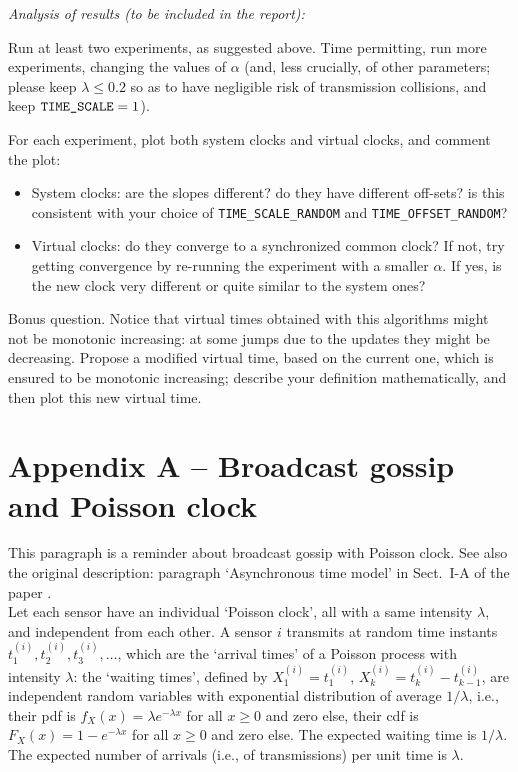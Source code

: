 \documentclass{article}
\begin{document}
{\itshape \color{blue} Analysis of results (to be included in the report):

Run at least two experiments, as suggested above.
Time permitting, run more experiments, changing the values of $\alpha$
(and, less crucially, of other parameters; please keep  $\lambda \le 0.2$ so as to have negligible risk of transmission collisions, and keep
$\verb=TIME_SCALE= = 1$).

For each experiment, plot both system clocks and virtual clocks, and comment the plot:
\begin{itemize}
	\item System clocks: are the slopes different? do they have different off-sets? is this consistent with your choice of \verb=TIME_SCALE_RANDOM= and \verb=TIME_OFFSET_RANDOM=?
	\item Virtual clocks: do they converge to a synchronized common clock? If not, try getting convergence by re-running the experiment with a smaller $\alpha$. If yes, is the new clock very different or quite similar to the system ones?
\end{itemize}
Bonus question. Notice that virtual times obtained with this algorithms might not be monotonic increasing: at some jumps due to the updates they might be decreasing. Propose a modified virtual time, based on the current one, which is ensured to be monotonic increasing; describe your definition mathematically, and then plot this new virtual time.
} %


\section*{Appendix A -- Broadcast gossip and Poisson clock}
This paragraph is a reminder about broadcast gossip with Poisson clock. See also the original description: paragraph `Asynchronous time model' in Sect.~I-A of the paper \cite{gossip-poisson}.\\

Let each sensor have an individual `Poisson clock', all with a same intensity $\lambda$, and independent from each other. A sensor $i$ transmits at random time instants $t_1^{(i)}, t_2^{(i)}, t_3^{(i)}, \dots$, which are the `arrival times' of a Poisson process with intensity $\lambda$: the `waiting times', defined by $X_1^{(i)} = t_1^{(i)}$, $X_k^{(i)} = t_k^{(i)}-t_{k-1}^{(i)}$, are independent random variables with exponential distribution of average $1/\lambda$, i.e., their pdf is $f_X(x) = \lambda e^{-\lambda x}$ for all $x \ge 0$ and zero else, their cdf is $F_X(x) = 1 - e^{-\lambda x} $ for all $x \ge 0$ and zero else. The expected waiting time is $1/\lambda$. The expected number of arrivals (i.e., of transmissions) per unit time is $\lambda$.\\
\end{document}
